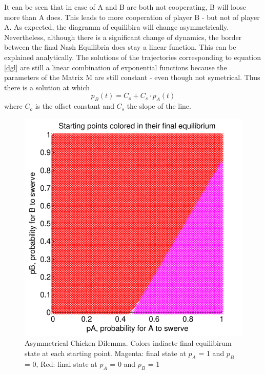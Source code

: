 \documentclass[11pt]{article}
\begin{document}
It can be seen that in case of A and B are both not cooperating, B will loose more than A does. This leads to more cooperation of player B - but not of player A. As expected, the diagramm of equilibira will change asymmetrically. Nevertheless, although there is a significant change of dynamics, the border between the final Nash Equilibria does stay a linear function. This can be explained analytically. The solutions of the trajectories corresponding to equation \ref{dgl} are still a linear combination of exponential functions because the parameters of the Matrix M are still constant - even though not symetrical. Thus there is a solution at which 
\begin{equation}
p_B(t) = C_o + C_s \cdot p_A(t)
\end{equation}
where $C_o$ is  the offset constant and $C_s$ the slope of the line.
\newline 


\begin{figure}[h]
\centering
\includegraphics[scale=1]{PhaseDiagramm2Da.pdf}
\caption{Asymmetrical Chicken Dilemma. Colors indiacte final equilibirum state at each starting point. Magenta: final state at $p_A$ = 1 and $p_B$ = 0, Red: final state at $p_A$ = 0 and $p_B$ = 1 }
\label{Phase2}
\end{figure}
\end{document}
